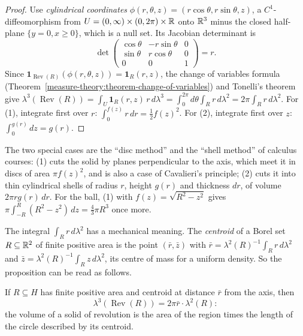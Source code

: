 \begin{proof}
Use \emph{cylindrical coordinates} $\phi(r, \theta, z) = (r\cos\theta, r\sin\theta, z)$, a $C^1$-diffeomorphism from $U = (0, \infty) \times (0, 2\pi) \times \mathbb{R}$ onto $\mathbb{R}^3$ minus the closed half-plane $\{y = 0, x \geq 0\}$,
which is a null set. Its Jacobian determinant is
\[
\det\begin{pmatrix}\cos\theta & -r\sin\theta & 0\\ \sin\theta & r\cos\theta & 0\\ 0 & 0 & 1\end{pmatrix} = r .
\]
Since $\mathbf{1}_{\operatorname{Rev}(R)}(\phi(r, \theta, z)) = \mathbf{1}_R(r, z)$, the change of variables formula (Theorem~\ref{measure-theory:theorem-change-of-variables}) and Tonelli's theorem give
$\lambda^3(\operatorname{Rev}(R)) = \int_U\mathbf{1}_R(r, z)\,r\,d\lambda^3 = \int_0^{2\pi}d\theta\int_Rr\,d\lambda^2 = 2\pi\int_Rr\,d\lambda^2$. For (1), integrate first over $r$: $\int_0^{f(z)}r\,dr = \frac12f(z)^2$. For
(2), integrate first over $z$: $\int_0^{g(r)}dz = g(r)$.
\end{proof}

The two special cases are the ``disc method'' and the ``shell method'' of calculus courses: (1) cuts the solid by planes perpendicular to the axis, which meet it in discs of area $\pi f(z)^2$, and is
also a case of Cavalieri's principle; (2) cuts it into thin cylindrical shells of radius $r$, height $g(r)$ and thickness $dr$, of volume $2\pi rg(r)\,dr$. For the ball, (1) with $f(z) = \sqrt{R^2 - z^2}$
gives $\pi\int_{-R}^R(R^2 - z^2)\,dz = \frac43\pi R^3$ once more.

The integral $\int_Rr\,d\lambda^2$ has a mechanical meaning. The \emph{centroid} of a Borel set $R \subseteq \mathbb{R}^2$ of finite positive area is the point $(\bar r, \bar z)$ with
$\bar r = \lambda^2(R)^{-1}\int_Rr\,d\lambda^2$ and $\bar z = \lambda^2(R)^{-1}\int_Rz\,d\lambda^2$, its centre of mass for a uniform density. So the proposition can be read as follows.

\begin{corollary}\label{measure-theory:corollary-pappus-volume}
If $R \subseteq H$ has finite positive area and centroid at distance $\bar r$ from the axis, then
\[
\lambda^3(\operatorname{Rev}(R)) = 2\pi\bar r \cdot \lambda^2(R):
\]
the volume of a solid of revolution is the area of the region times the length of the circle described by its centroid.
\end{corollary}

